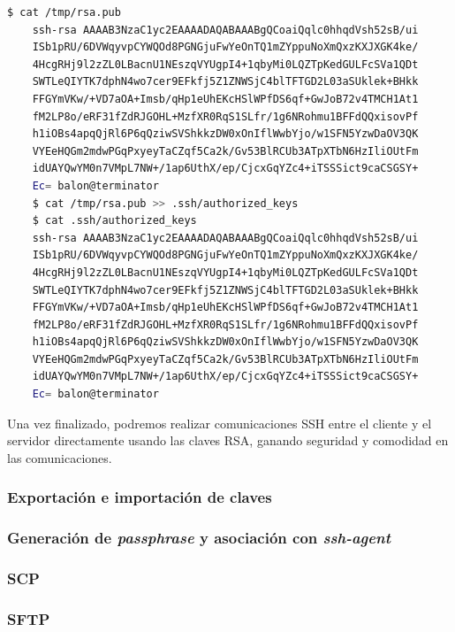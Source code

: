 \documentclass[a4paper, 11pt, titlepage]{article}
\begin{document}
        \begin{lstlisting}[language=bash,basicstyle=\scriptsize]
    $ cat /tmp/rsa.pub
    ssh-rsa AAAAB3NzaC1yc2EAAAADAQABAAABgQCoaiQqlc0hhqdVsh52sB/ui
    ISb1pRU/6DVWqyvpCYWQOd8PGNGjuFwYeOnTQ1mZYppuNoXmQxzKXJXGK4ke/
    4HcgRHj9l2zZL0LBacnU1NEszqVYUgpI4+1qbyMi0LQZTpKedGULFcSVa1QDt
    SWTLeQIYTK7dphN4wo7cer9EFkfj5Z1ZNWSjC4blTFTGD2L03aSUklek+BHkk
    FFGYmVKw/+VD7aOA+Imsb/qHp1eUhEKcHSlWPfDS6qf+GwJoB72v4TMCH1At1
    fM2LP8o/eRF31fZdRJGOHL+MzfXR0RqS1SLfr/1g6NRohmu1BFFdQQxisovPf
    h1iOBs4apqQjRl6P6qQziwSVShkkzDW0xOnIflWwbYjo/w1SFN5YzwDaOV3QK
    VYEeHQGm2mdwPGqPxyeyTaCZqf5Ca2k/Gv53BlRCUb3ATpXTbN6HzIliOUtFm
    idUAYQwYM0n7VMpL7NW+/1ap6UthX/ep/CjcxGqYZc4+iTSSSict9caCSGSY+
    Ec= balon@terminator
    $ cat /tmp/rsa.pub >> .ssh/authorized_keys
    $ cat .ssh/authorized_keys
    ssh-rsa AAAAB3NzaC1yc2EAAAADAQABAAABgQCoaiQqlc0hhqdVsh52sB/ui
    ISb1pRU/6DVWqyvpCYWQOd8PGNGjuFwYeOnTQ1mZYppuNoXmQxzKXJXGK4ke/
    4HcgRHj9l2zZL0LBacnU1NEszqVYUgpI4+1qbyMi0LQZTpKedGULFcSVa1QDt
    SWTLeQIYTK7dphN4wo7cer9EFkfj5Z1ZNWSjC4blTFTGD2L03aSUklek+BHkk
    FFGYmVKw/+VD7aOA+Imsb/qHp1eUhEKcHSlWPfDS6qf+GwJoB72v4TMCH1At1
    fM2LP8o/eRF31fZdRJGOHL+MzfXR0RqS1SLfr/1g6NRohmu1BFFdQQxisovPf
    h1iOBs4apqQjRl6P6qQziwSVShkkzDW0xOnIflWwbYjo/w1SFN5YzwDaOV3QK
    VYEeHQGm2mdwPGqPxyeyTaCZqf5Ca2k/Gv53BlRCUb3ATpXTbN6HzIliOUtFm
    idUAYQwYM0n7VMpL7NW+/1ap6UthX/ep/CjcxGqYZc4+iTSSSict9caCSGSY+
    Ec= balon@terminator\end{lstlisting}
        
        Una vez finalizado, podremos realizar comunicaciones SSH entre el cliente y 
        el servidor directamente usando las claves RSA, ganando seguridad y comodidad 
        en las comunicaciones.

    \subsubsection{Exportación e importación de claves}
    \subsubsection{Generación de \textit{passphrase} y asociación con \textit{ssh-agent}}
    \subsubsection{SCP} \label{scp}
    \subsubsection{SFTP}
\end{document}
